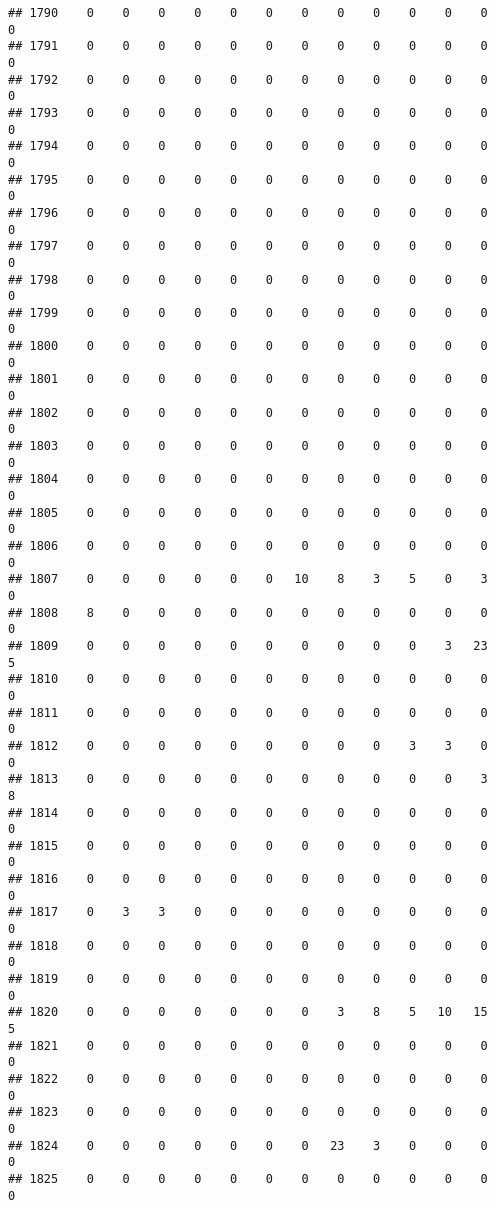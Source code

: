 \documentclass[]{article}
\begin{document}
\begin{verbatim}
## 1790    0    0    0    0    0    0    0    0    0    0    0    0    0
## 1791    0    0    0    0    0    0    0    0    0    0    0    0    0
## 1792    0    0    0    0    0    0    0    0    0    0    0    0    0
## 1793    0    0    0    0    0    0    0    0    0    0    0    0    0
## 1794    0    0    0    0    0    0    0    0    0    0    0    0    0
## 1795    0    0    0    0    0    0    0    0    0    0    0    0    0
## 1796    0    0    0    0    0    0    0    0    0    0    0    0    0
## 1797    0    0    0    0    0    0    0    0    0    0    0    0    0
## 1798    0    0    0    0    0    0    0    0    0    0    0    0    0
## 1799    0    0    0    0    0    0    0    0    0    0    0    0    0
## 1800    0    0    0    0    0    0    0    0    0    0    0    0    0
## 1801    0    0    0    0    0    0    0    0    0    0    0    0    0
## 1802    0    0    0    0    0    0    0    0    0    0    0    0    0
## 1803    0    0    0    0    0    0    0    0    0    0    0    0    0
## 1804    0    0    0    0    0    0    0    0    0    0    0    0    0
## 1805    0    0    0    0    0    0    0    0    0    0    0    0    0
## 1806    0    0    0    0    0    0    0    0    0    0    0    0    0
## 1807    0    0    0    0    0    0   10    8    3    5    0    3    0
## 1808    8    0    0    0    0    0    0    0    0    0    0    0    0
## 1809    0    0    0    0    0    0    0    0    0    0    3   23    5
## 1810    0    0    0    0    0    0    0    0    0    0    0    0    0
## 1811    0    0    0    0    0    0    0    0    0    0    0    0    0
## 1812    0    0    0    0    0    0    0    0    0    3    3    0    0
## 1813    0    0    0    0    0    0    0    0    0    0    0    3    8
## 1814    0    0    0    0    0    0    0    0    0    0    0    0    0
## 1815    0    0    0    0    0    0    0    0    0    0    0    0    0
## 1816    0    0    0    0    0    0    0    0    0    0    0    0    0
## 1817    0    3    3    0    0    0    0    0    0    0    0    0    0
## 1818    0    0    0    0    0    0    0    0    0    0    0    0    0
## 1819    0    0    0    0    0    0    0    0    0    0    0    0    0
## 1820    0    0    0    0    0    0    0    3    8    5   10   15    5
## 1821    0    0    0    0    0    0    0    0    0    0    0    0    0
## 1822    0    0    0    0    0    0    0    0    0    0    0    0    0
## 1823    0    0    0    0    0    0    0    0    0    0    0    0    0
## 1824    0    0    0    0    0    0    0   23    3    0    0    0    0
## 1825    0    0    0    0    0    0    0    0    0    0    0    0    0

\end{verbatim}
\end{document}
